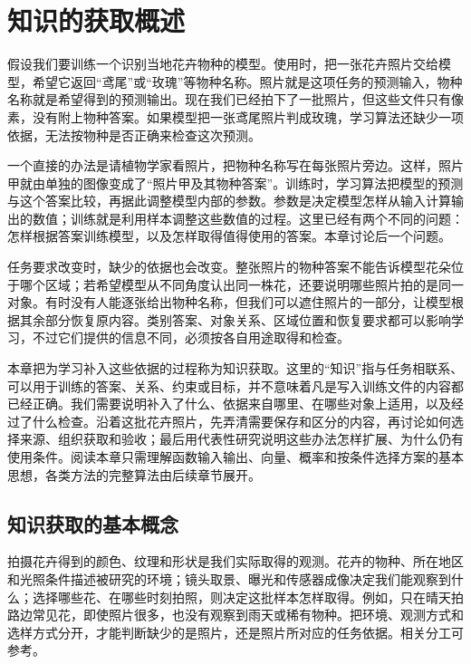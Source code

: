 \chapter{知识的获取概述}
\label{chap:knowledge-acquisition-overview}

假设我们要训练一个识别当地花卉物种的模型。使用时，把一张花卉照片交给模型，希望它返回“鸢尾”或“玫瑰”等物种名称。照片就是这项任务的预测输入，物种名称就是希望得到的预测输出。现在我们已经拍下了一批照片，但这些文件只有像素，没有附上物种答案。如果模型把一张鸢尾照片判成玫瑰，学习算法还缺少一项依据，无法按物种是否正确来检查这次预测。

一个直接的办法是请植物学家看照片，把物种名称写在每张照片旁边。这样，照片甲就由单独的图像变成了“照片甲及其物种答案”。训练时，学习算法把模型的预测与这个答案比较，再据此调整模型内部的参数。参数是决定模型怎样从输入计算输出的数值；训练就是利用样本调整这些数值的过程。这里已经有两个不同的问题：怎样根据答案训练模型，以及怎样取得值得使用的答案。本章讨论后一个问题。

任务要求改变时，缺少的依据也会改变。整张照片的物种答案不能告诉模型花朵位于哪个区域；若希望模型从不同角度认出同一株花，还要说明哪些照片拍的是同一对象。有时没有人能逐张给出物种名称，但我们可以遮住照片的一部分，让模型根据其余部分恢复原内容。类别答案、对象关系、区域位置和恢复要求都可以影响学习，不过它们提供的信息不同，必须按各自用途取得和检查。

本章把为学习补入这些依据的过程称为知识获取。这里的“知识”指与任务相联系、可以用于训练的答案、关系、约束或目标，并不意味着凡是写入训练文件的内容都已经正确。我们需要说明补入了什么、依据来自哪里、在哪些对象上适用，以及经过了什么检查。沿着这批花卉照片，先弄清需要保存和区分的内容，再讨论如何选择来源、组织获取和验收；最后用代表性研究说明这些办法怎样扩展、为什么仍有使用条件。阅读本章只需理解函数输入输出、向量、概率和按条件选择方案的基本思想，各类方法的完整算法由后续章节展开。

\section{知识获取的基本概念}
\label{sec:knowledge-acquisition-problem}

拍摄花卉得到的颜色、纹理和形状是我们实际取得的观测。花卉的物种、所在地区和光照条件描述被研究的环境；镜头取景、曝光和传感器成像决定我们能观察到什么；选择哪些花、在哪些时刻拍照，则决定这批样本怎样取得。例如，只在晴天拍路边常见花，即使照片很多，也没有观察到雨天或稀有物种。把环境、观测方式和选样方式分开，才能判断缺少的是照片，还是照片所对应的任务依据。相关分工可参考。

